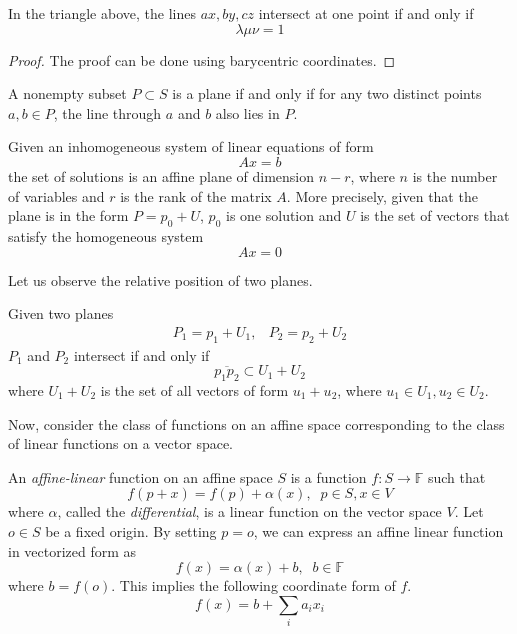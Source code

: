 \documentclass{article}
\begin{document}
    \begin{corollary}
    In the triangle above, the lines $ax, by, cz$ intersect at one point if and only if 
    \[\lambda \mu \nu = 1\]
    \end{corollary}
    \begin{proof}
    The proof can be done using barycentric coordinates. 
    \end{proof}

    \begin{theorem}
    A nonempty subset $P \subset S$ is a plane if and only if for any two distinct points $a, b \in P$, the line through $a$ and $b$ also lies in $P$. 
    \end{theorem}

    \begin{theorem}
    Given an inhomogeneous system of linear equations of form 
    \[A x = b\]
    the set of solutions is an affine plane of dimension $n-r$, where $n$ is the number of variables and $r$ is the rank of the matrix $A$. More precisely, given that the plane is in the form $P = p_0 + U$, $p_0$ is one solution and $U$ is the set of vectors that satisfy the homogeneous system
    \[Ax = 0 \]
    \end{theorem}

    Let us observe the relative position of two planes. 

    \begin{theorem}
    Given two planes 
    \begin{align*}
        P_1 = p_1 + U_1, & P_2 = p_2 + U_2
    \end{align*}
    $P_1$ and $P_2$ intersect if and only if 
    \[\overline{p_1 p_2} \subset U_1 + U_2\]
    where $U_1 + U_2$ is the set of all vectors of form $u_1 + u_2$, where $u_1 \in U_1, u_2 \in U_2$. 
    \end{theorem}

    Now, consider the class of functions on an affine space corresponding to the class of linear functions on a vector space. 

    \begin{definition}
    An \textit{affine-linear} function on an affine space $S$ is a function $f: S \longrightarrow \mathbb{F}$ such that
    \[f(p + x) = f(p) + \alpha (x), \;\; p \in S , x \in V\]
    where $\alpha$, called the \textit{differential}, is a linear function on the vector space $V$. Let $o \in S$ be a fixed origin. By setting $p = o$, we can express an affine linear function in vectorized form as 
    \[f(x) = \alpha (x) + b, \;\; b \in \mathbb{F}\]
    where $b = f(o)$. This implies the following coordinate form of $f$. 
    \[f(x) = b + \sum_i a_i x_i\]
    \end{definition}
\end{document}
